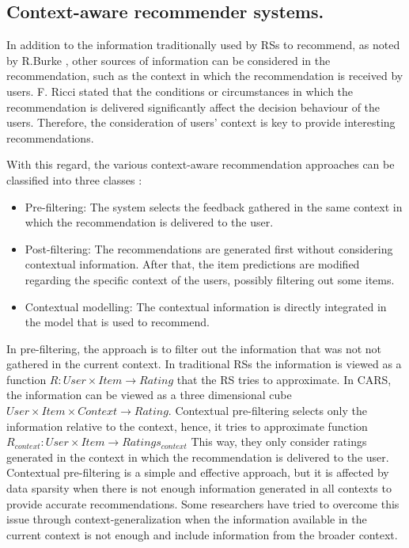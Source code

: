 \documentclass[preprint]{elsarticle}
\begin{document}
\begin{spacing}{1.5}
\subsection{Context-aware recommender systems.}

In addition to the information traditionally used by RSs to recommend, as noted by R.Burke \cite{Burke2002}, other sources of information can be considered in the recommendation, such as the context in which the recommendation is received by users. F. Ricci \cite{Ricci2012contextualizing} stated that the conditions or circumstances in which the recommendation is delivered significantly affect the decision behaviour of the users. Therefore, the consideration of users' context is key to provide interesting recommendations.

With this regard, the various context-aware recommendation approaches can be classified into three classes \cite{Adomavicius2011}:
\begin{itemize}
	\item Pre-filtering: The system selects the feedback gathered in the same context in which the recommendation is delivered to the user.
	\item Post-filtering: The recommendations are generated first without considering contextual information. After that, the item predictions are modified regarding the specific context of the users, possibly filtering out some items.
	\item Contextual modelling: The contextual information is directly integrated in the model that is used to recommend.
\end{itemize}

In pre-filtering, the approach is to filter out the information that was not not gathered in the current context. In traditional RSs the information is viewed as a function $R: User \times Item \rightarrow Rating $ that the RS tries to approximate. In CARS, the information can be viewed as a three dimensional cube $User \times Item \times Context \rightarrow Rating$. Contextual pre-filtering selects only the information relative to the context, hence, it tries to approximate function $R_{context}: User \times Item \rightarrow Ratings_{context}$ This way, they only consider ratings generated in the context in which the recommendation is delivered to the user. Contextual pre-filtering is a simple and effective approach, but it is affected by data sparsity when there is not enough information generated in all contexts to provide accurate recommendations. Some researchers have tried to overcome this issue through context-generalization \cite{Adomavicius2011} when the information available in the current context is not enough and include information from the broader context.


\end{spacing}
\end{document}
